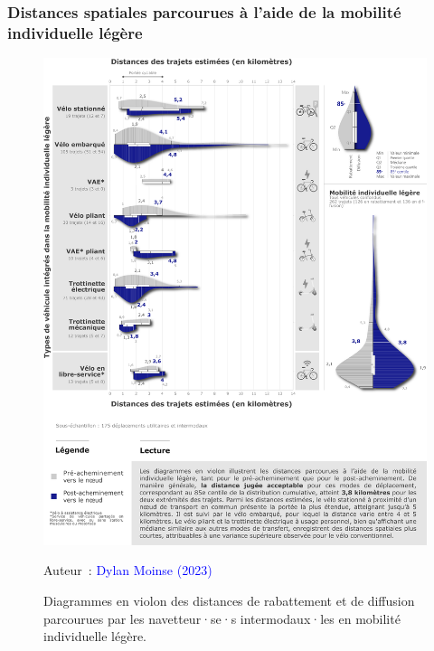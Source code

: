 \begin{refsegment}
\subsubsection*{Distances spatiales parcourues à l'aide de la mobilité individuelle légère
    \label{chap5:distances-spatiales-parcourues}
    }

    \begin{figure}[h!]\vspace*{4pt}
        \caption{Diagrammes en violon des distances de rabattement et de diffusion parcourues par les navetteur·se·s intermodaux·les en mobilité individuelle légère.}
        \label{fig-chap5:diagrammes-violons}
        \centerline{\includegraphics[width=1\columnwidth]{src/Figures/Chap-5/FR_Distances_Violons_Navetteurs.png}}
        \vspace{5pt}
        \begin{flushright}\scriptsize{
        Auteur~: \textcolor{blue}{Dylan Moinse (2023)}
        }\end{flushright}
    \end{figure}
    

\end{refsegment}
